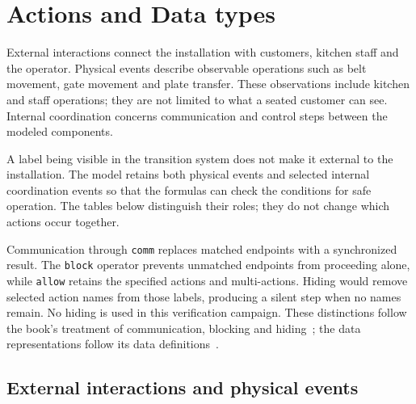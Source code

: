 \documentclass[11pt,a4paper]{article}
\begin{document}
\section{Actions and Data types}
\label{sec:actions}
External interactions connect the installation with customers, kitchen staff and the operator. Physical events describe observable operations such as belt movement, gate movement and plate transfer. These observations include kitchen and staff operations; they are not limited to what a seated customer can see. Internal coordination concerns communication and control steps between the modeled components.

A label being visible in the transition system does not make it external to the installation. The model retains both physical events and selected internal coordination events so that the formulas can check the conditions for safe operation. The tables below distinguish their roles; they do not change which actions occur together.

Communication through \texttt{comm} replaces matched endpoints with a synchronized result. The \texttt{block} operator prevents unmatched endpoints from proceeding alone, while \texttt{allow} retains the specified actions and multi-actions. Hiding would remove selected action names from those labels, producing a silent step when no names remain. No hiding is used in this verification campaign. These distinctions follow the book's treatment of communication, blocking and hiding~\cite[Ch.~5]{book}; the data representations follow its data definitions~\cite[Ch.~3]{book}.

\subsection{External interactions and physical events}
\end{document}
